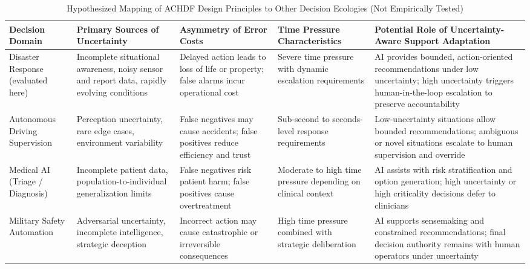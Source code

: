 \documentclass[journal]{IEEEtran}
\theoremstyle{plain}
\theoremstyle{definition}
\begin{document}
\begin{table}[t]
\centering
\caption{Hypothesized Mapping of ACHDF Design Principles to Other Decision Ecologies (Not Empirically Tested)}
\label{tab:achdf_transferability}
\begin{tabular}{p{3cm} p{3.2cm} p{3.2cm} p{2.8cm} p{3.9cm}}
\hline
\textbf{Decision Domain} &
\textbf{Primary Sources of Uncertainty} &
\textbf{Asymmetry of Error Costs} &
\textbf{Time Pressure Characteristics} &
\textbf{Potential Role of Uncertainty-Aware Support Adaptation} \\
\hline
Disaster Response (evaluated here) &
Incomplete situational awareness, noisy sensor and report data, rapidly evolving conditions &
Delayed action leads to loss of life or property; false alarms incur operational cost &
Severe time pressure with dynamic escalation requirements &
AI provides bounded, action-oriented recommendations under low uncertainty; high uncertainty triggers human-in-the-loop escalation to preserve accountability \\

Autonomous Driving Supervision &
Perception uncertainty, rare edge cases, environment variability &
False negatives may cause accidents; false positives reduce efficiency and trust &
Sub-second to seconds-level response requirements &
Low-uncertainty situations allow bounded recommendations; ambiguous or novel situations escalate to human supervision and override \\

Medical AI (Triage / Diagnosis) &
Incomplete patient data, population-to-individual generalization limits &
False negatives risk patient harm; false positives cause overtreatment &
Moderate to high time pressure depending on clinical context &
AI assists with risk stratification and option generation; high uncertainty or high criticality decisions defer to clinicians \\

Military Safety Automation &
Adversarial uncertainty, incomplete intelligence, strategic deception &
Incorrect action may cause catastrophic or irreversible consequences &
High time pressure combined with strategic deliberation &
AI supports sensemaking and constrained recommendations; final decision authority remains with human operators under uncertainty \\

\hline
\end{tabular}
\end{table}
\end{document}
